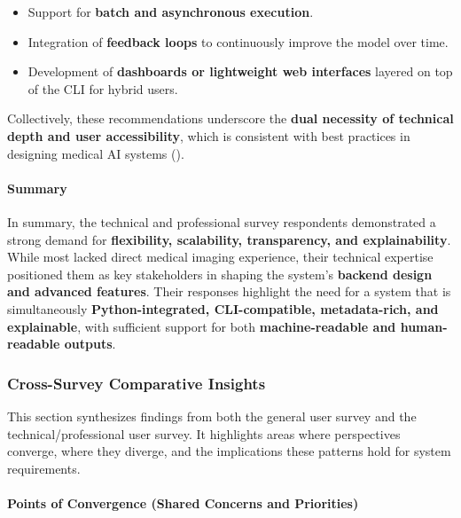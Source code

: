 \documentclass[
  12pt,
  oneside]{article}
\providecommand{\tightlist}{%
  \setlength{\itemsep}{0pt}\setlength{\parskip}{0pt}}
\begin{document}
\begin{itemize}
\tightlist
\item
  Support for \textbf{batch and asynchronous execution}.
\item
  Integration of \textbf{feedback loops} to continuously improve the
  model over time.
\item
  Development of \textbf{dashboards or lightweight web interfaces}
  layered on top of the CLI for hybrid users.
\end{itemize}

Collectively, these recommendations underscore the \textbf{dual
necessity of technical depth and user accessibility}, which is
consistent with best practices in designing medical AI systems
().

\paragraph{Summary}\label{summary-1}

In summary, the technical and professional survey respondents
demonstrated a strong demand for \textbf{flexibility, scalability,
transparency, and explainability}. While most lacked direct medical
imaging experience, their technical expertise positioned them as key
stakeholders in shaping the system's \textbf{backend design and advanced
features}. Their responses highlight the need for a system that is
simultaneously \textbf{Python-integrated, CLI-compatible, metadata-rich,
and explainable}, with sufficient support for both
\textbf{machine-readable and human-readable outputs}.

\subsubsection{Cross-Survey Comparative
Insights}\label{cross-survey-comparative-insights}

This section synthesizes findings from both the general user survey and
the technical/professional user survey. It highlights areas where
perspectives converge, where they diverge, and the implications these
patterns hold for system requirements.

\paragraph{Points of Convergence (Shared Concerns and
Priorities)}\label{points-of-convergence-shared-concerns-and-priorities}
\end{document}
